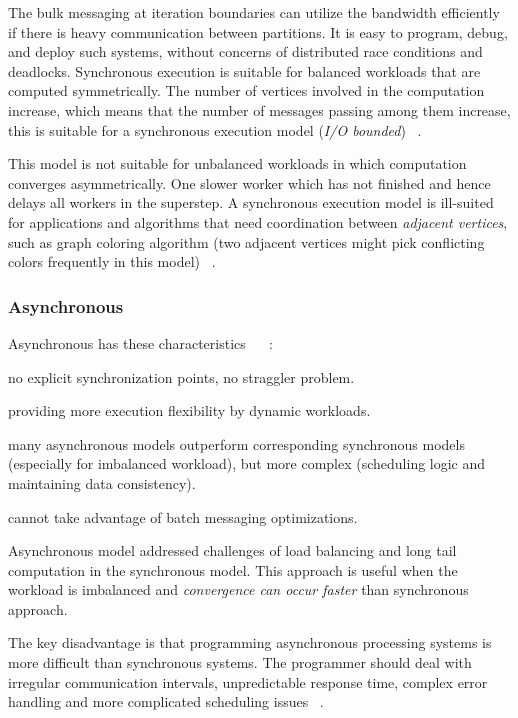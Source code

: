 \documentclass[UTF8,12pt,a4paper]{article}
\begin{document}
The bulk messaging at iteration boundaries can utilize the bandwidth
efficiently if there is heavy communication between partitions.
It is easy to program, debug, and deploy such systems,
without concerns of distributed race conditions and deadlocks.
Synchronous execution is suitable for balanced workloads that are computed symmetrically.
The number of vertices involved in the computation increase,
which means that the number of messages passing among them increase,
this is suitable for a synchronous execution model (\textit{I/O bounded})
~\cite{DBLP:journals/csur/HeidariSCB18}.

This model is not suitable for unbalanced workloads
in which computation converges asymmetrically.
One slower worker which has not finished and
hence delays all workers in the superstep.
A synchronous execution model is ill-suited
for applications and algorithms that need coordination between \textit{adjacent vertices},
such as graph coloring algorithm
(two adjacent vertices might pick conflicting colors frequently in this model)
~\cite{DBLP:journals/csur/HeidariSCB18}.

\subsubsection{Asynchronous}
Asynchronous has these characteristics
~\cite{DBLP:journals/csur/McCuneWM15}
~\cite{DBLP:journals/csur/HeidariSCB18}:
\begin{compactitem}
  \item no explicit synchronization points, no straggler problem.
  \item providing more execution flexibility by dynamic workloads.
  \item many asynchronous models outperform corresponding synchronous models
  (especially for imbalanced workload),
  but more complex (scheduling logic and maintaining data consistency).
  \item cannot take advantage of batch messaging optimizations.
\end{compactitem}

Asynchronous model addressed challenges of
load balancing and long tail computation in the synchronous model.
This approach is useful when the workload is imbalanced
and \textit{convergence can occur faster} than synchronous approach.

The key disadvantage is that programming asynchronous processing systems
is more difficult than synchronous systems.
The programmer should deal with irregular communication intervals,
unpredictable response time, complex error handling
and more complicated scheduling issues
~\cite{DBLP:journals/csur/HeidariSCB18}.
\end{document}
